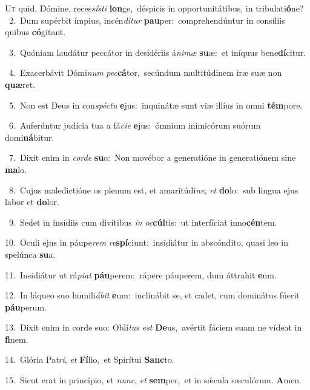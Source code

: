 \lettrine{\initial\textcolor{\initialcolor}{U}}{t} quid, Dómine, reces\-\textit{sís}\-\textit{ti} \textbf{lon}\-ge,~\star déspicis in opportunitátibus, in tribulati\-\textbf{ó}\-ne?\\
{\numbfont\textcolor{\numbcolor}{~2.}}~Dum supérbit ímpius, incén\-\textit{di}\-\textit{tur} \textbf{pau}\-per:~\star comprehendúntur in consíliis quibus \textbf{có}\-gitant.\par
{\numbfont\textcolor{\numbcolor}{~3.}}~Quóniam laudátur peccátor in desidériis á\-\textit{ni}\-\textit{mæ} \textbf{su}\-æ:~\star et iníquus bene\-\textbf{dí}\-citur.\par
{\numbfont\textcolor{\numbcolor}{~4.}}~Exacerbávit Dómi\textit{num} \textit{pec}\-\textbf{cá}tor,~\star secúndum multitúdinem iræ suæ non \textbf{quæ}\-ret.\par
{\numbfont\textcolor{\numbcolor}{~5.}}~Non est Deus in con\-\textit{spéc}\-\textit{tu} \textbf{e}\-jus:~\star inquinátæ sunt viæ illíus in omni \textbf{tém}\-pore.\par
{\numbfont\textcolor{\numbcolor}{~6.}}~Auferúntur judícia tua a fá\-\textit{ci}\-\textit{e} \textbf{e}\-jus:~\star ómnium inimicórum suórum domi\-\textbf{ná}\-bitur.\par
{\numbfont\textcolor{\numbcolor}{~7.}}~Dixit enim in \textit{cor}\-\textit{de} \textbf{su}\-o:~\star Non movébor a generatióne in generatiónem sine \textbf{ma}\-lo.\par
{\numbfont\textcolor{\numbcolor}{~8.}}~Cujus maledictióne os plenum est, et amaritúdi\-\textit{ne}\-, \textit{et} \textbf{do}\-lo:~\star sub lingua ejus labor et \textbf{do}\-lor.\par
{\numbfont\textcolor{\numbcolor}{~9.}}~Sedet in insídiis cum divítibus \textit{in} \textit{oc}\-\textbf{cúl}tis:~\star ut interfíciat inno\-\textbf{cén}\-tem.\par
{\numbfont\textcolor{\numbcolor}{10.}}~Oculi ejus in páupe\textit{rem} \textit{re}\-\textbf{spí}ciunt:~\star insidiátur in abscóndito, quasi leo in spelúnca \textbf{su}\-a.\par
{\numbfont\textcolor{\numbcolor}{11.}}~Insidiátur ut rá\-\textit{pi}\-\textit{at} \textbf{páu}\-perem:~\star rápere páuperem, dum áttrahit \textbf{e}\-um.\par
{\numbfont\textcolor{\numbcolor}{12.}}~In láqueo suo humili\-\textit{á}\-\textit{bit} \textbf{e}\-um:~\star inclinábit se, et cadet, cum dominátus fúerit \textbf{páu}\-perum.\par
{\numbfont\textcolor{\numbcolor}{13.}}~Dixit enim in corde suo: Oblí\textit{tus} \textit{est} \textbf{De}\-us,~\star avértit fáciem suam ne vídeat in \textbf{fi}\-nem.\par
{\numbfont\textcolor{\numbcolor}{14.}}~Glória Pa\-\textit{tri}\-, \textit{et} \textbf{Fí}\-lio,~\star et Spirítui \textbf{Sanc}\-to.\par
{\numbfont\textcolor{\numbcolor}{15.}}~Sicut erat in princípio, et \textit{nunc}\-, \textit{et} \textbf{sem}\-per,~\star et in sǽcula sæculórum. \textbf{A}\-men.\par
